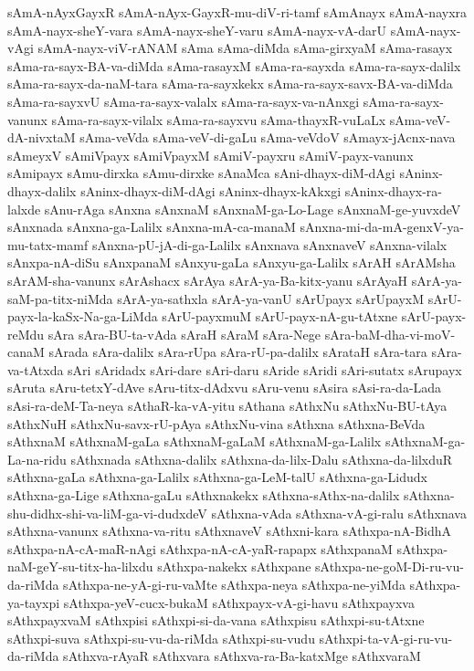 {sAmA-nAyxGayxR
sAmA-nAyx-GayxR-mu-diV-ri-tamf
sAmAnayx
sAmA-nayxra
sAmA-nayx-sheY-vara
sAmA-nayx-sheY-varu
sAmA-nayx-vA-darU
sAmA-nayx-vAgi
sAmA-nayx-viV-rANAM
sAma
sAma-diMda
sAma-girxyaM
sAma-rasayx
sAma-ra-sayx-BA-va-diMda
sAma-rasayxM
sAma-ra-sayxda
sAma-ra-sayx-dalilx
sAma-ra-sayx-da-naM-tara
sAma-ra-sayxkekx
sAma-ra-sayx-savx-BA-va-diMda
sAma-ra-sayxvU
sAma-ra-sayx-valalx
sAma-ra-sayx-va-nAnxgi
sAma-ra-sayx-vanunx
sAma-ra-sayx-vilalx
sAma-ra-sayxvu
sAma-thayxR-vuLaLx
sAma-veV-dA-nivxtaM
sAma-veVda
sAma-veV-di-gaLu
sAma-veVdoV
sAmayx-jAcnx-nava
sAmeyxV
sAmiVpayx
sAmiVpayxM
sAmiV-payxru
sAmiV-payx-vanunx
sAmipayx
sAmu-dirxka
sAmu-dirxke
sAnaMca
sAni-dhayx-diM-dAgi
sAninx-dhayx-dalilx
sAninx-dhayx-diM-dAgi
sAninx-dhayx-kAkxgi
sAninx-dhayx-ra-lalxde
sAnu-rAga
sAnxna
sAnxnaM
sAnxnaM-ga-Lo-Lage
sAnxnaM-ge-yuvxdeV
sAnxnada
sAnxna-ga-Lalilx
sAnxna-mA-ca-manaM
sAnxna-mi-da-mA-genxV-ya-mu-tatx-mamf
sAnxna-pU-jA-di-ga-Lalilx
sAnxnava
sAnxnaveV
sAnxna-vilalx
sAnxpa-nA-diSu
sAnxpanaM
sAnxyu-gaLa
sAnxyu-ga-Lalilx
sArAH
sArAMsha
sArAM-sha-vanunx
sArAshacx
sArAya
sArA-ya-Ba-kitx-yanu
sArAyaH
sArA-ya-saM-pa-titx-niMda
sArA-ya-sathxla
sArA-ya-vanU
sArUpayx
sArUpayxM
sArU-payx-la-kaSx-Na-ga-LiMda
sArU-payxmuM
sArU-payx-nA-gu-tAtxne
sArU-payx-reMdu
sAra
sAra-BU-ta-vAda
sAraH
sAraM
sAra-Nege
sAra-baM-dha-vi-moV-canaM
sArada
sAra-dalilx
sAra-rUpa
sAra-rU-pa-dalilx
sArataH
sAra-tara
sAra-va-tAtxda
sAri
sAridadx
sAri-dare
sAri-daru
sAride
sAridi
sAri-sutatx
sArupayx
sAruta
sAru-tetxY-dAve
sAru-titx-dAdxvu
sAru-venu
sAsira
sAsi-ra-da-Lada
sAsi-ra-deM-Ta-neya
sAthaR-ka-vA-yitu
sAthana
sAthxNu
sAthxNu-BU-tAya
sAthxNuH
sAthxNu-savx-rU-pAya
sAthxNu-vina
sAthxna
sAthxna-BeVda
sAthxnaM
sAthxnaM-gaLa
sAthxnaM-gaLaM
sAthxnaM-ga-Lalilx
sAthxnaM-ga-La-na-ridu
sAthxnada
sAthxna-dalilx
sAthxna-da-lilx-Dalu
sAthxna-da-lilxduR
sAthxna-gaLa
sAthxna-ga-Lalilx
sAthxna-ga-LeM-talU
sAthxna-ga-Lidudx
sAthxna-ga-Lige
sAthxna-gaLu
sAthxnakekx
sAthxna-sAthx-na-dalilx
sAthxna-shu-didhx-shi-va-liM-ga-vi-dudxdeV
sAthxna-vAda
sAthxna-vA-gi-ralu
sAthxnava
sAthxna-vanunx
sAthxna-va-ritu
sAthxnaveV
sAthxni-kara
sAthxpa-nA-BidhA
sAthxpa-nA-cA-maR-nAgi
sAthxpa-nA-cA-yaR-rapapx
sAthxpanaM
sAthxpa-naM-geY-su-titx-ha-lilxdu
sAthxpa-nakekx
sAthxpane
sAthxpa-ne-goM-Di-ru-vu-da-riMda
sAthxpa-ne-yA-gi-ru-vaMte
sAthxpa-neya
sAthxpa-ne-yiMda
sAthxpa-ya-tayxpi
sAthxpa-yeV-cucx-bukaM
sAthxpayx-vA-gi-havu
sAthxpayxva
sAthxpayxvaM
sAthxpisi
sAthxpi-si-da-vana
sAthxpisu
sAthxpi-su-tAtxne
sAthxpi-suva
sAthxpi-su-vu-da-riMda
sAthxpi-su-vudu
sAthxpi-ta-vA-gi-ru-vu-da-riMda
sAthxva-rAyaR
sAthxvara
sAthxva-ra-Ba-katxMge
sAthxvaraM
}
